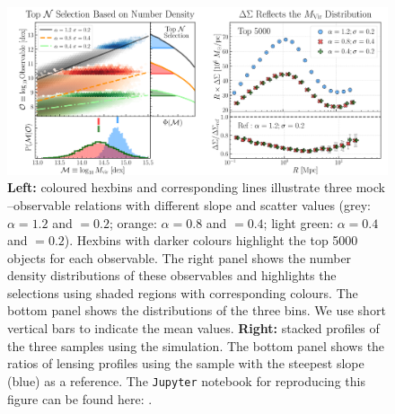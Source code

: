 \documentclass[fleqn,usenatbib,useAMS]{mnras}
\begin{document}
\begin{figure}
\includegraphics[width=\textwidth]{figure/fig_1}
\caption{
    \textbf{Left:} coloured hexbins and corresponding lines illustrate
        three mock \mvir{}--observable relations with different slope and scatter values
        (grey: $\alpha=1.2$ and \scatterObsSymMhalo{}$=0.2$; 
        orange: $\alpha=0.8$ and \scatterObsSymMhalo{}$=0.4$;
        light green: $\alpha=0.4$ and \scatterObsSymMhalo{}$=0.2$).
        Hexbins with darker colours highlight the top 5000 objects for each observable.
        The right panel shows the number density distributions of these observables
        and highlights the \topn{} selections using shaded regions with corresponding 
        colours.
        The bottom panel shows the \mvir{} distributions of the three \topn{} bins.
        We use short vertical bars to indicate the mean \mvir{} values.
    \textbf{Right:} stacked \rdsigma{} profiles of the three \topn{} samples using the 
         simulation. 
        The bottom panel shows the ratios of lensing profiles using the sample with the steepest
        slope (blue) as a reference.
    The \texttt{Jupyter} notebook for reproducing this figure can be found here:
    \href{https://github.com/dr-guangtou/jianbing/blob/master/notebooks/figure/fig1.ipynb}{\faGithub}.
    }
    \label{fig:theory_1}
\end{figure}
    
\end{document}
